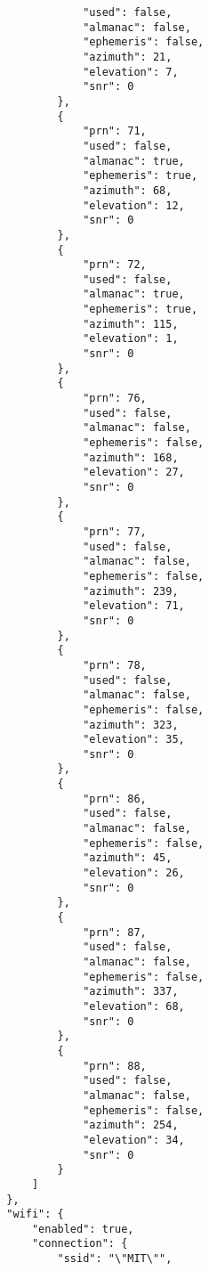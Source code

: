 \begin{verbatim}
                    "used": false,
                    "almanac": false,
                    "ephemeris": false,
                    "azimuth": 21,
                    "elevation": 7,
                    "snr": 0
                },
                {
                    "prn": 71,
                    "used": false,
                    "almanac": true,
                    "ephemeris": true,
                    "azimuth": 68,
                    "elevation": 12,
                    "snr": 0
                },
                {
                    "prn": 72,
                    "used": false,
                    "almanac": true,
                    "ephemeris": true,
                    "azimuth": 115,
                    "elevation": 1,
                    "snr": 0
                },
                {
                    "prn": 76,
                    "used": false,
                    "almanac": false,
                    "ephemeris": false,
                    "azimuth": 168,
                    "elevation": 27,
                    "snr": 0
                },
                {
                    "prn": 77,
                    "used": false,
                    "almanac": false,
                    "ephemeris": false,
                    "azimuth": 239,
                    "elevation": 71,
                    "snr": 0
                },
                {
                    "prn": 78,
                    "used": false,
                    "almanac": false,
                    "ephemeris": false,
                    "azimuth": 323,
                    "elevation": 35,
                    "snr": 0
                },
                {
                    "prn": 86,
                    "used": false,
                    "almanac": false,
                    "ephemeris": false,
                    "azimuth": 45,
                    "elevation": 26,
                    "snr": 0
                },
                {
                    "prn": 87,
                    "used": false,
                    "almanac": false,
                    "ephemeris": false,
                    "azimuth": 337,
                    "elevation": 68,
                    "snr": 0
                },
                {
                    "prn": 88,
                    "used": false,
                    "almanac": false,
                    "ephemeris": false,
                    "azimuth": 254,
                    "elevation": 34,
                    "snr": 0
                }
            ]
        },
        "wifi": {
            "enabled": true,
            "connection": {
                "ssid": "\"MIT\"",

\end{verbatim}
